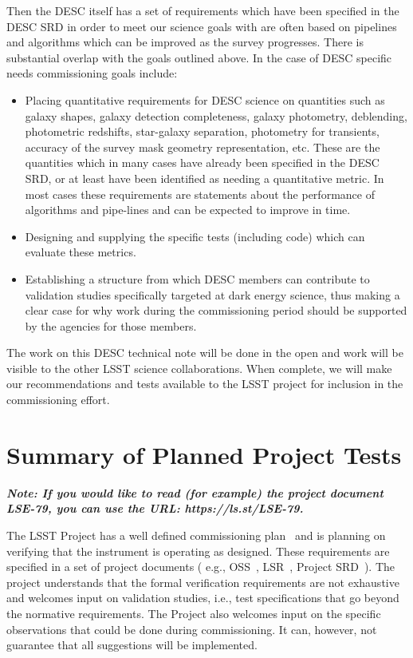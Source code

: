 \documentclass[modern]{desc-tex/styles/lsstdescnote}
\begin{document}
Then the DESC itself has a set of requirements which have been specified in the DESC SRD in order to meet our science goals with are often based on pipelines and algorithms which can be improved as the survey progresses. There is substantial overlap with the goals outlined above.  In the case of DESC specific needs commissioning goals include:

\begin{itemize}

\item Placing quantitative requirements for DESC science on quantities such as galaxy shapes, galaxy detection completeness, galaxy photometry, deblending, photometric redshifts, star-galaxy separation, photometry for transients, accuracy of the survey mask geometry representation, etc.  These are the quantities which in many cases have already been specified in the DESC SRD, or at least have been identified as needing a quantitative metric.  In most cases these requirements are statements about the performance of algorithms and pipe-lines and can be expected to improve in time.

\item Designing and supplying the specific tests (including code) which can evaluate these metrics.

\item Establishing a structure from which DESC members can contribute to validation studies specifically targeted at dark energy science, thus making a clear case for why work during the commissioning period should be supported by the agencies for those members.
  
\end{itemize}

The work on this DESC technical note will be done in the open and work will be visible to the other LSST science collaborations.  When complete, we will make our recommendations and tests available to the LSST project for inclusion in the commissioning effort.

\section{Summary of Planned Project Tests}
\label{sec:project-tests}

{\bf \it Note: If you would like to read (for example) the project
  document LSE-79, you can use the URL: https://ls.st/LSE-79.}

The LSST Project has a well defined commissioning plan~\cite{LSE-79} and is planning on verifying that the instrument is operating as designed.  These requirements are specified in a set of project documents ( e.g., OSS~\cite{LSE-30}, LSR~\cite{LSE-29}, Project SRD~\cite{LPM-17}). The project understands that the formal verification requirements are not exhaustive and welcomes input on validation studies, i.e., test specifications that go beyond the normative requirements. The Project also welcomes input on the specific observations that could be done during commissioning. It can, however, not guarantee that all suggestions will be implemented.
\end{document}

